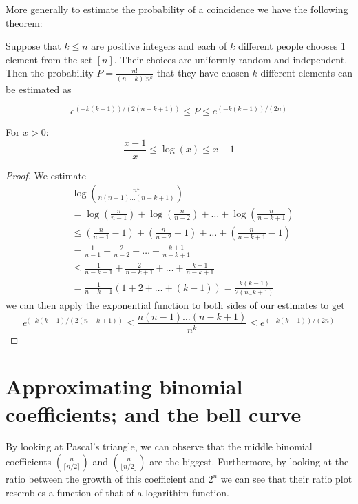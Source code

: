 More generally to estimate the probability of a coincidence we have the following theorem:
\begin{theorem}
	Suppose that $k\leq n$ are positive integers and each of $k$ different people chooses 1 element from the set $[n]$. Their choices are uniformly random and independent. Then the probability $P=\frac{n!}{(n-k)!n^{k}}$ that they have chosen $k$ different elements can be estimated as

\begin{equation}  
    e^{(-k(k-1))/(2(n-k+1))}\leq P\leq e^{(-k(k-1))/(2n)}\label{prob1}
\end{equation}
\end{theorem}
\begin{lemma}
For $x>0$:
$$
\frac{x-1}{x}\leq \log(x)\leq x-1
$$
\end{lemma}
\begin{proof}
We estimate
\begin{align*}
 & \log\left( \frac{n^{k}}{n(n-1)\dots(n-k+1)} \right) \\
 & =\log\left( \frac{n}{n-1} \right)+\log\left( \frac{n}{n-2} \right)+\dots+\log\left( \frac{n}{n-k+1} \right) \\
 & \leq \left( \frac{n}{n-1}-1 \right)+\left( \frac{n}{n-2}-1 \right)+\dots+\left( \frac{n}{n-k+1}-1 \right) \\
 & =\frac{1}{n-1}+\frac{2}{n-2}+\dots+\frac{k+1}{n-k+1} \\
 & \leq \frac{1}{n-k+1}+\frac{2}{n-k+1}+\dots+\frac{k-1}{n-k+1} \\
 & =\frac{1}{n-k+1}(1+2+\dots+(k-1))=\frac{k(k-1)}{2(n_-k+1)}
\end{align*}
we can then apply the exponential function to both sides of our estimates to get
\begin{equation}
  e^{(-k(k-1)/(2(n-k+1))}\le \frac{n(n-1)\dots(n-k+1)}{n^{k}}\le e^{(-k(k-1))/(2n)} \label{logineq}
\end{equation}\end{proof}


\section{Approximating binomial coefficients; and the bell curve}
By looking at Pascal's triangle, we can observe that the middle binomial coefficients $\binom{n}{\lceil n/ 2\rceil}$ and $\binom{n}{\lfloor n/2 \rfloor}$ are the biggest. Furthermore, by looking at the ratio between the growth of this coefficient and $2^{n}$ we can see that their ratio plot resembles a function of that of a logarithim function.

